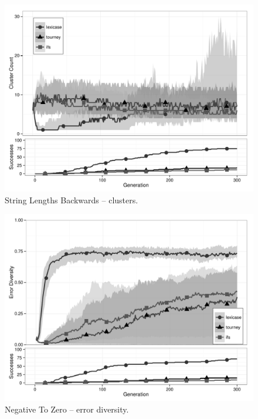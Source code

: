 \begin{figure}[p] %
\centering
\includegraphics[width=11.5cm]{string-lengths-backwards-cluster.pdf}
\caption{String Lengths Backwards -- clusters.}
\label{string-lengths-backwardsClu}
\end{figure}

\begin{figure}[p] %
\centering
\includegraphics[width=11.5cm]{negative-to-zero-diversity.pdf}
\caption{Negative To Zero -- error diversity.}
\label{negative-to-zeroDiv}
\end{figure}

